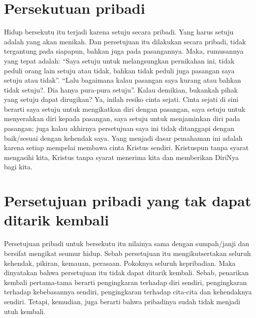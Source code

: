 \section{Persekutuan pribadi}
Hidup bersekutu itu terjadi karena setuju secara pribadi. Yang harus setuju adalah yang akan menikah. Dan persetujuan itu dilakukan secara pribadi, tidak tergantung pada siapapun, bahkan juga pada pasangannya. Maka, rumusannya yang tepat adalah: “Saya setu­ju untuk melangsungkan pernikahan ini, tidak peduli orang lain setuju atau tidak, bahkan tidak peduli juga pasangan saya setuju atau tidak”.
“Lalu bagaimana kalau pasangan saya kurang atau bahkan tidak setuju?. Dia hanya pura-pura setuju”. Kalau demikian, bukankah pihak yang setuju dapat dirugikan? Ya, inilah resiko cinta sejati. Cinta sejati di sini berarti saya setuju untuk mengikatkan diri dengan pasangan, saya setuju untuk menyerahkan diri kepada pasangan, saya setuju untuk menjaminkan diri pada pasangan; juga kalau akhirnya persetujuan saya ini tidak ditanggapi dengan baik/sesuai dengan kehendak saya. Yang menjadi dasar pemahaman ini adalah karena setiap mempelai membawa cinta Kristus sendiri. Kristuspun tanpa syarat mengasihi kita, Kristus tanpa syarat menerima kita dan memberikan DiriNya bagi kita.

\section{Persetujuan pribadi yang tak dapat ditarik kembali}
Persetujuan pribadi untuk bersekutu itu nilainya sama dengan sumpah/janji dan bersifat mengikat seumur hidup. Sebab persetujuan itu mengikutsertakan seluruh kehendak, pikiran, kemauan, pera­saan. Pokoknya seluruh kepribadian. Maka dinyatakan bahwa perse­tujuan itu tidak dapat ditarik kembali. Sebab, penarikan kembali pertama-tama berarti pengingkaran terhadap diri sendiri, penging­karan terhadap kebebasannya sendiri, pengingkaran terhadap cita-cita dan kehendaknya sendiri. Tetapi, kemudian, juga berarti bah­wa pribadinya sudah tidak menjadi utuh kembali.


